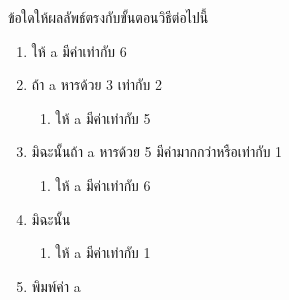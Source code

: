 ﻿%
\question ข้อใดให้ผลลัพธ์ตรงกับขั้นตอนวิธีต่อไปนี้
\begin{pseudocode}
\begin{enumerate}
    \item ให้ a มีค่าเท่ากับ 6
    \item ถ้า a หารด้วย 3 เท่ากับ 2 
        \begin{enumerate}
            \item ให้ a มีค่าเท่ากับ 5
        \end{enumerate}
    \item มิฉะนั้นถ้า a หารด้วย 5 มีค่ามากกว่าหรือเท่ากับ 1
        \begin{enumerate}
            \item ให้ a มีค่าเท่ากับ 6
        \end{enumerate}
    \item มิฉะนั้น
        \begin{enumerate}
            \item ให้ a มีค่าเท่ากับ 1
        \end{enumerate}
    \item พิมพ์ค่า a
\end{enumerate}
\end{pseudocode}

